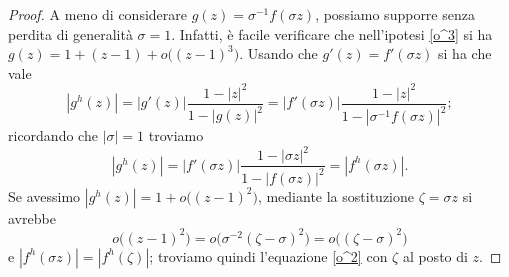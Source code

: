 \begin{proof}
  A meno di considerare $g(z)=\sigma^{-1}f(\sigma z)$, possiamo supporre senza perdita di generalità $\sigma=1$. Infatti, è facile verificare che nell'ipotesi \eqref{o^3} si ha $g(z)=1+(z-1)+o\bigl((z-1)^3\bigr)$. Usando che $g'(z)=f'(\sigma z)$ si ha che vale
  $$|g^h(z)|=|g'(z)|\frac{1-|z|^2}{1-|g(z)|^2}=|f'(\sigma z)|\frac{1-|z|^2}{1-|\sigma^{-1}f(\sigma z)|^2};$$
  ricordando che $|\sigma|=1$ troviamo
  $$|g^h(z)|=|f'(\sigma z)|\frac{1-|\sigma z|^2}{1-|f(\sigma z)|^2}=|f^h(\sigma z)|.$$
  Se avessimo $|g^h(z)|=1+o\bigl((z-1)^2\bigr)$, mediante la sostituzione $\zeta=\sigma z$ si avrebbe
  $$o\bigl((z-1)^2\bigr)=o\bigl(\sigma^{-2}(\zeta-\sigma)^2\bigr)=o\bigl((\zeta-\sigma)^2\bigr)$$
  e $|f^h(\sigma z)|=|f^h(\zeta)|$; troviamo quindi l'equazione \eqref{o^2} con $\zeta$ al posto di $z$.


\end{proof}
